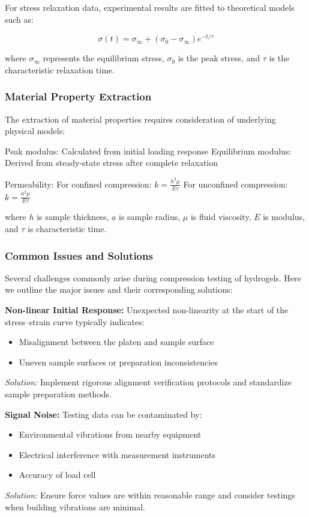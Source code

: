 For stress relaxation data, experimental results are fitted to theoretical models such as:

$$\sigma(t) = \sigma_{\infty} + (\sigma_0 - \sigma_{\infty})e^{-t/\tau}$$

where $\sigma_{\infty}$ represents the equilibrium stress, $\sigma_0$ is the peak stress, and $\tau$ is the characteristic relaxation time.

\subsubsection{Material Property Extraction}

The extraction of material properties requires consideration of underlying physical models:

Peak modulus: Calculated from initial loading response
Equilibrium modulus: Derived from steady-state stress after complete relaxation

Permeability:
For confined compression: $k = \frac{h^2 \mu}{E \tau}$
For unconfined compression: $k = \frac{a^2 \mu}{E \tau}$

where $h$ is sample thickness, $a$ is sample radius, $\mu$ is fluid viscosity, $E$ is modulus, and $\tau$ is characteristic time.

\subsubsection{Common Issues and Solutions}

Several challenges commonly arise during compression testing of hydrogels. Here we outline the major issues and their corresponding solutions:

\textbf{Non-linear Initial Response:}  
Unexpected non-linearity at the start of the stress--strain curve typically indicates:
\begin{itemize}
    \item Misalignment between the platen and sample surface
    \item Uneven sample surfaces or preparation inconsistencies
\end{itemize}
\textit{Solution:} Implement rigorous alignment verification protocols and standardize sample preparation methods.

\textbf{Signal Noise:}  
Testing data can be contaminated by:
\begin{itemize}
    \item Environmental vibrations from nearby equipment
    \item Electrical interference with measurement instruments 
    \item Accuracy of load cell
\end{itemize}
\textit{Solution:}  Ensure force values are within reasonable range and consider testings when building vibrations are minimal.

